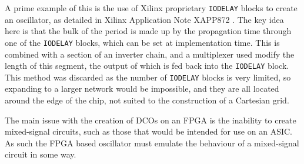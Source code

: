 A prime example of this is the use of Xilinx proprietary \texttt{IODELAY} blocks to create an oscillator, as detailed in Xilinx Application Note XAPP872 \cite{iodelay}. The key idea here is that the bulk of the period is made up by the propagation time through one of the \texttt{IODELAY} blocks, which can be set at implementation time. This is combined with a section of an inverter chain, and a multiplexer used modify the length of this segment, the output of which is fed back into the \texttt{IODELAY} block. This method was discarded as the number of \texttt{IODELAY} blocks is very limited, so expanding to a larger network would be impossible, and they are all located around the edge of the chip, not suited to the construction of a Cartesian grid.

The main issue with the creation of \ac{DCO}s on an \ac{FPGA} is the inability to create mixed-signal circuits, such as those that would be intended for use on an \ac{ASIC}. As such the \ac{FPGA} based oscillator must emulate the behaviour of a mixed-signal circuit in some way.

